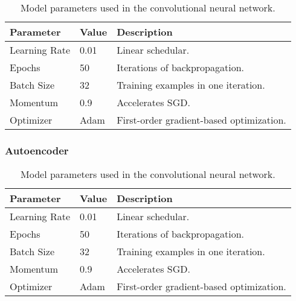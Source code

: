 \documentclass[12pt,english]{article}
\begin{document}
\begin{table}[ht]
\centering
\begin{tabular}{@{}lll@{}}
\toprule
\textbf{Parameter} & \textbf{Value} & \textbf{Description} \\ \midrule
Learning Rate & 0.01 & Linear schedular. \\
Epochs & 50 & Iterations of backpropagation. \\
Batch Size & 32 & Training examples in one iteration. \\
Momentum & 0.9 & Accelerates SGD. \\
Optimizer & Adam & First-order gradient-based optimization. \\
\bottomrule
\end{tabular}
\caption{Model parameters used in the convolutional neural network.}
\label{tab:model_params}
\end{table}

\subsubsection{Autoencoder}

\begin{table}[ht]
\centering
\begin{tabular}{@{}lll@{}}
\toprule
\textbf{Parameter} & \textbf{Value} & \textbf{Description} \\ \midrule
Learning Rate & 0.01 & Linear schedular. \\
Epochs & 50 & Iterations of backpropagation. \\
Batch Size & 32 & Training examples in one iteration. \\
Momentum & 0.9 & Accelerates SGD. \\
Optimizer & Adam & First-order gradient-based optimization. \\
\bottomrule
\end{tabular}
\caption{Model parameters used in the convolutional neural network.}
\label{tab:model_params}
\end{table}
\end{document}
